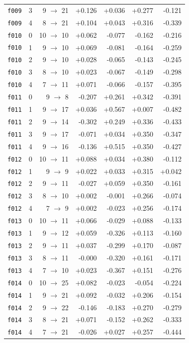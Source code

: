 \documentclass[11pt]{article}
\begin{document}
\begin{table}[htbp]
\begin{tabular}{llrrrrr}
\texttt{f009} & 3 & 9 $\to$ 21 & +0.126 & +0.036 & +0.277 & -0.121 \\
\texttt{f009} & 4 & 8 $\to$ 21 & +0.104 & +0.043 & +0.316 & -0.339 \\
\texttt{f010} & 0 & 10 $\to$ 10 & +0.062 & -0.077 & -0.162 & -0.216 \\
\texttt{f010} & 1 & 9 $\to$ 10 & +0.069 & -0.081 & -0.164 & -0.259 \\
\texttt{f010} & 2 & 9 $\to$ 10 & +0.028 & -0.065 & -0.143 & -0.245 \\
\texttt{f010} & 3 & 8 $\to$ 10 & +0.023 & -0.067 & -0.149 & -0.298 \\
\texttt{f010} & 4 & 7 $\to$ 11 & +0.071 & -0.066 & -0.157 & -0.395 \\
\texttt{f011} & 0 & 9 $\to$ 8 & -0.207 & +0.261 & +0.342 & -0.391 \\
\texttt{f011} & 1 & 9 $\to$ 17 & +0.036 & +0.567 & +0.007 & -0.482 \\
\texttt{f011} & 2 & 9 $\to$ 14 & -0.302 & +0.249 & +0.336 & -0.433 \\
\texttt{f011} & 3 & 9 $\to$ 17 & -0.071 & +0.034 & +0.350 & -0.347 \\
\texttt{f011} & 4 & 9 $\to$ 16 & -0.136 & +0.515 & +0.350 & -0.427 \\
\texttt{f012} & 0 & 10 $\to$ 11 & +0.088 & +0.034 & +0.380 & -0.112 \\
\texttt{f012} & 1 & 9 $\to$ 9 & +0.022 & +0.033 & +0.315 & +0.042 \\
\texttt{f012} & 2 & 9 $\to$ 11 & -0.027 & +0.059 & +0.350 & -0.161 \\
\texttt{f012} & 3 & 8 $\to$ 10 & +0.002 & -0.001 & +0.266 & -0.074 \\
\texttt{f012} & 4 & 7 $\to$ 9 & +0.002 & -0.023 & +0.256 & -0.174 \\
\texttt{f013} & 0 & 10 $\to$ 11 & +0.066 & -0.029 & +0.088 & -0.133 \\
\texttt{f013} & 1 & 9 $\to$ 12 & +0.059 & -0.326 & +0.113 & -0.160 \\
\texttt{f013} & 2 & 9 $\to$ 11 & +0.037 & -0.299 & +0.170 & -0.087 \\
\texttt{f013} & 3 & 8 $\to$ 11 & -0.000 & -0.320 & +0.161 & -0.171 \\
\texttt{f013} & 4 & 7 $\to$ 10 & +0.023 & -0.367 & +0.151 & -0.276 \\
\texttt{f014} & 0 & 10 $\to$ 25 & +0.082 & -0.023 & -0.054 & -0.224 \\
\texttt{f014} & 1 & 9 $\to$ 21 & +0.092 & -0.032 & +0.206 & -0.154 \\
\texttt{f014} & 2 & 9 $\to$ 22 & -0.146 & -0.183 & +0.270 & -0.279 \\
\texttt{f014} & 3 & 8 $\to$ 21 & +0.071 & -0.152 & +0.262 & -0.333 \\
\texttt{f014} & 4 & 7 $\to$ 21 & -0.026 & +0.027 & +0.257 & -0.444 \\
\bottomrule
\end{tabular}
\end{table}
\end{document}
